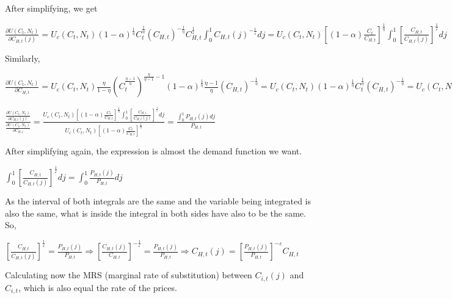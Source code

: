 \documentclass[
]{article}
\begin{document}
After simplifying, we get

\(\displaystyle \frac{\partial U(C_t,N_t)}{\partial C_{H,t}(j)} = U_c(C_t,N_t) (1-\alpha)^{\frac{1}{\eta}} C_t^{\frac{1}{\eta}}\left( C_{H,t}\right)^{-\frac{1}{\eta}}C_{H,t}^{\frac{1}{\varepsilon}} \int_0^1 C_{H,t}(j)^{-\frac{1}{\varepsilon}}dj = U_c(C_t,N_t) \left[ (1-\alpha) \frac{C_t}{C_{H,t}} \right]^{\frac{1}{\eta}} \int_0^1 \left[\frac{C_{H,t}}{C_{H,t}(j)}\right]^{\frac{1}{\varepsilon}}dj\)

Similarly,

\(\displaystyle \frac{\partial U(C_t,N_t)}{\partial C_{H,t}} = U_c(C_t,N_t)\frac{\eta}{1-\eta}\left( C_t^{\frac{\eta-1}{\eta}} \right)^{\frac{\eta}{\eta-1}-1} (1-\alpha)^{\frac{1}{\eta}}\frac{\eta-1}{\eta}\left( C_{H,t}\right)^{-\frac{1}{\eta}} = U_c(C_t,N_t) (1-\alpha)^{\frac{1}{\eta}} C_t^{\frac{1}{\eta}}\left( C_{H,t}\right)^{-\frac{1}{\eta}} = U_c(C_t,N_t) \left[ (1-\alpha) \frac{C_t}{C_{H,t}} \right]^{\frac{1}{\eta}}\)

\(\displaystyle \frac{\displaystyle \frac{\partial U(C_t,N_t)}{\displaystyle \partial C_{H,t}(j)}}{\frac{\displaystyle \partial U(C_t,N_t)}{\displaystyle \partial C_{H,t}}} = \frac{\displaystyle U_c(C_t,N_t) \left[ (1-\alpha) \frac{C_t}{C_{H,t}} \right]^{\frac{1}{\eta}} \int_0^1 \left[\frac{C_{H,t}}{C_{H,t}(j)}\right]^{\frac{1}{\varepsilon}}dj}{\displaystyle U_c(C_t,N_t) \left[ (1-\alpha) \frac{C_t}{C_{H,t}} \right]^{\frac{1}{\eta}}} = \frac{\displaystyle \int_0^1P_{H,t}(j)dj}{P_{H,t}}\)

After simplifying again, the expression is almost the demand function we
want.

\(\displaystyle \int_0^1 \left[\frac{C_{H,t}}{C_{H,t}(j)}\right]^{\frac{1}{\varepsilon}}dj = \displaystyle \int_0^1 \frac{P_{H,t}(j)}{P_{H,t}}dj\)

As the interval of both integrals are the same and the variable being
integrated is also the same, what is inside the integral in both sides
have also to be the same. So,

\(\displaystyle \left[\frac{C_{H,t}}{C_{H,t}(j)}\right]^{\frac{1}{\varepsilon}} = \frac{P_{H,t}(j)}{P_{H,t}} \Rightarrow \left[\frac{C_{H,t}(j)}{C_{H,t}}\right]^{-\frac{1}{\varepsilon}} = \frac{P_{H,t}(j)}{P_{H,t}} \Rightarrow C_{H,t}(j)= \left[ \frac{P_{H,t}(j)}{P_{H,t}} \right]^{-\varepsilon}C_{H,t}\)

Calculating now the MRS (marginal rate of substitution) between
\(C_{i,t}(j)\) and \(C_{i,t}\), which is also equal the rate of the
prices.
\end{document}
